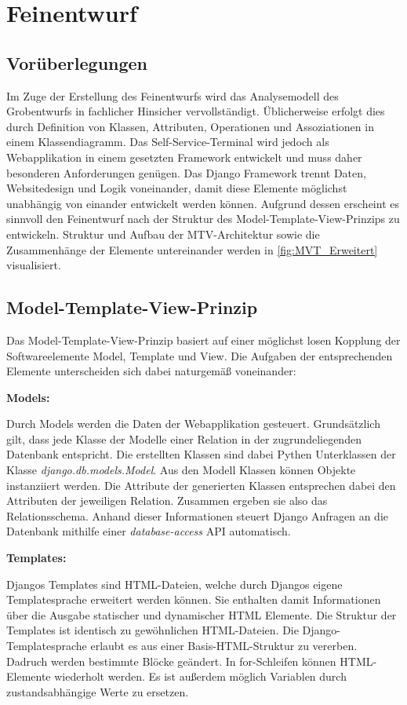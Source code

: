 \section{Feinentwurf}
\subsection{Vorüberlegungen}
Im Zuge der Erstellung des Feinentwurfs wird das Analysemodell des Grobentwurfs in fachlicher Hinsicher vervollständigt. Üblicherweise erfolgt dies durch Definition von Klassen, Attributen, Operationen und Assoziationen in einem Klassendiagramm. Das Self-Service-Terminal wird jedoch als Webapplikation in einem gesetzten Framework entwickelt und muss daher besonderen Anforderungen genügen.
Das Django Framework trennt Daten, Websitedesign und Logik voneinander, damit diese Elemente möglichst unabhängig von einander entwickelt werden können. Aufgrund dessen erscheint es sinnvoll den Feinentwurf nach der Struktur des Model-Template-View-Prinzips zu entwickeln. Struktur und Aufbau der MTV-Architektur sowie die Zusammenhänge der Elemente untereinander werden in \ref{fig:MVT_Erweitert} visualisiert.

\vspace{0,5cm}

\subsection{Model-Template-View-Prinzip}
Das Model-Template-View-Prinzip basiert auf einer möglichst losen Kopplung der Softwareelemente Model, Template und View. Die Aufgaben der entsprechenden Elemente unterscheiden sich dabei naturgemäß voneinander:\par 
\newpage 
\noindent \textbf{Models:} \par
\vspace{0,5cm}
\noindent Durch Models werden die Daten der Webapplikation gesteuert. Grundsätzlich gilt, dass jede Klasse der Modelle einer Relation in der zugrundeliegenden Datenbank entspricht. Die erstellten Klassen sind dabei Pythen Unterklassen der Klasse \textit{django.db.models.Model}. Aus den Modell Klassen können Objekte instanziiert werden. Die Attribute der generierten Klassen entsprechen dabei den Attributen der jeweiligen Relation. Zusammen ergeben sie also das Relationsschema. Anhand dieser Informationen steuert Django Anfragen an die Datenbank mithilfe einer \textit{database-access} API automatisch.\par
\vspace{1cm}
\noindent \textbf{Templates:}\par
\vspace{0,5cm}
\noindent Djangos Templates sind HTML-Dateien, welche durch Djangos eigene Templatesprache erweitert werden können. Sie enthalten damit Informationen über die Ausgabe statischer und dynamischer HTML Elemente. Die Struktur der Templates ist identisch zu gewöhnlichen HTML-Dateien. Die Django-Templatesprache erlaubt es aus einer Basis-HTML-Struktur zu vererben. Dadruch werden bestimmte Blöcke geändert. In for-Schleifen können HTML-Elemente wiederholt werden. Es ist außerdem möglich Variablen durch zustandsabhängige Werte zu ersetzen.

